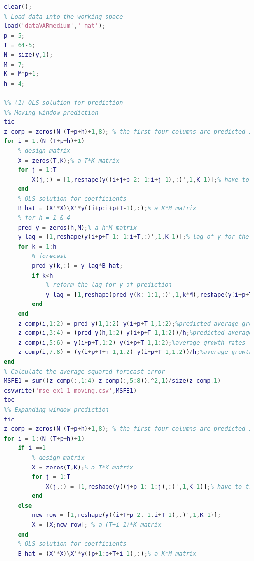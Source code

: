 \documentclass[11pt, oneside]{article}   	%
\begin{document}
\begin{lstlisting}[language=Matlab ,caption={Matlab code for problem 1.}, label={code:prob1}]
clear();
% Load data into the working space
load('dataVARmedium','-mat');
p = 5;
T = 64-5;
N = size(y,1);
M = 7;
K = M*p+1;
h = 4;

%% (1) OLS solution for prediction
%% Moving window prediction
tic
z_comp = zeros(N-(T+p+h)+1,8); % the first four columns are predicted z (average growth rate of GDP) and the second four columns is the real z
for i = 1:(N-(T+p+h)+1)
    % design matrix
    X = zeros(T,K);% a T*K matrix
    for j = 1:T
        X(j,:) = [1,reshape(y((i+j+p-2:-1:i+j-1),:)',1,K-1)];% have to transpose because the reshape function operate in column
    end
    % OLS solution for coefficients
    B_hat = (X'*X)\X'*y((i+p:i+p+T-1),:);% a K*M matrix
    % for h = 1 & 4
    pred_y = zeros(h,M);% a h*M matrix
    y_lag = [1,reshape(y(i+p+T-1:-1:i+T,:)',1,K-1)];% lag of y for the prediction
    for k = 1:h
        % forecast
        pred_y(k,:) = y_lag*B_hat;
        if k<h
            % reform the lag for y of prediction
            y_lag = [1,reshape(pred_y(k:-1:1,:)',1,k*M),reshape(y(i+p+T-1:-1:i+T+k,:)',1,K-1-k*M)];
        end
    end
    z_comp(i,1:2) = pred_y(1,1:2)-y(i+p+T-1,1:2);%predicted average growth rates for one quarter of (i) log-real GDP and (ii) log-GDP delector
    z_comp(i,3:4) = (pred_y(h,1:2)-y(i+p+T-1,1:2))/h;%predicted average growth rates for h quarters of (i) log-real GDP and (ii) log-GDP delector
    z_comp(i,5:6) = y(i+p+T,1:2)-y(i+p+T-1,1:2);%average growth rates for one quarter of (i) log-real GDP and (ii) log-GDP delector
    z_comp(i,7:8) = (y(i+p+T+h-1,1:2)-y(i+p+T-1,1:2))/h;%average growth rates for h quarters of (i) log-real GDP and (ii) log-GDP delector
end
% Calculate the average squared forecast error
MSFE1 = sum((z_comp(:,1:4)-z_comp(:,5:8)).^2,1)/size(z_comp,1)
csvwrite('mse_ex1-1-moving.csv',MSFE1)
toc
%% Expanding window prediction
tic
z_comp = zeros(N-(T+p+h)+1,8); % the first four columns are predicted z (average growth rate of GDP) and the second four columns is the real z
for i = 1:(N-(T+p+h)+1)
    if i ==1
        % design matrix
        X = zeros(T,K);% a T*K matrix
        for j = 1:T
            X(j,:) = [1,reshape(y((j+p-1:-1:j),:)',1,K-1)];% have to transpose because the reshape function operate in column
        end
    else
        new_row = [1,reshape(y((i+T+p-2:-1:i+T-1),:)',1,K-1)];
        X = [X;new_row]; % a (T+i-1)*K matrix
    end
    % OLS solution for coefficients
    B_hat = (X'*X)\X'*y((p+1:p+T+i-1),:);% a K*M matrix

\end{lstlisting}
\end{document}
